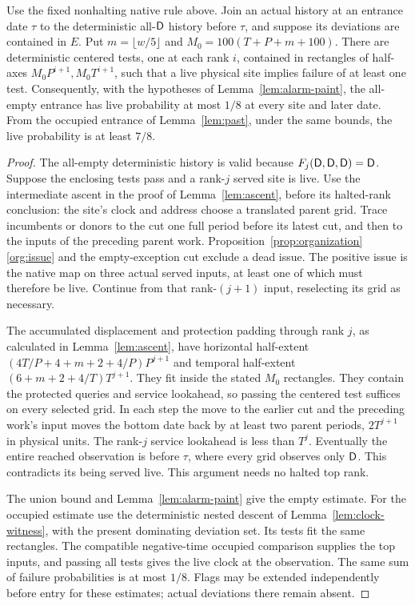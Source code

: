 \begin{lemma}\label{lem:empty-ancestry}
Use the fixed nonhalting native rule above. Join an actual history at an entrance date \(\tau\) to the deterministic all-\(\mathsf D\) history before \(\tau\), and suppose its deviations are contained in \(E\). Put \(m=\lfloor w/5\rfloor\) and \(M_0=100(T+P+m+100)\). There are deterministic centered tests, one at each rank \(i\), contained in rectangles of half-axes \(M_0P^{i+1},M_0T^{i+1}\), such that a live physical site implies failure of at least one test. Consequently, with the hypotheses of Lemma~\ref{lem:alarm-paint}, the all-empty entrance has live probability at most \(1/8\) at every site and later date. From the occupied entrance of Lemma~\ref{lem:past}, under the same bounds, the live probability is at least \(7/8\).
\end{lemma}

\begin{proof}
The all-empty deterministic history is valid because \(F_j(\mathsf D,\mathsf D,\mathsf D)=\mathsf D\). Suppose the enclosing tests pass and a rank-\(j\) served site is live. Use the intermediate ascent in the proof of Lemma~\ref{lem:ascent}, before its halted-rank conclusion: the site's clock and address choose a translated parent grid. Trace incumbents or donors to the cut one full period before its latest cut, and then to the inputs of the preceding parent work. Proposition~\ref{prop:organization}\ref{org:issue} and the empty-exception cut exclude a dead issue. The positive issue is the native map on three actual served inputs, at least one of which must therefore be live. Continue from that rank-\((j+1)\) input, reselecting its grid as necessary.

The accumulated displacement and protection padding through rank \(j\), as calculated in Lemma~\ref{lem:ascent}, have horizontal half-extent
\((4T/P+4+m+2+4/P)P^{j+1}\) and temporal half-extent \((6+m+2+4/T)T^{j+1}\). They fit inside the stated \(M_0\) rectangles. They contain the protected queries and service lookahead, so passing the centered test suffices on every selected grid. In each step the move to the earlier cut and the preceding work's input moves the bottom date back by at least two parent periods, \(2T^{j+1}\) in physical units. The rank-\(j\) service lookahead is less than \(T^j\). Eventually the entire reached observation is before \(\tau\), where every grid observes only \(\mathsf D\). This contradicts its being served live. This argument needs no halted top rank.

The union bound and Lemma~\ref{lem:alarm-paint} give the empty estimate. For the occupied estimate use the deterministic nested descent of Lemma~\ref{lem:clock-witness}, with the present dominating deviation set. Its tests fit the same rectangles. The compatible negative-time occupied comparison supplies the top inputs, and passing all tests gives the live clock at the observation. The same sum of failure probabilities is at most \(1/8\). Flags may be extended independently before entry for these estimates; actual deviations there remain absent.
\end{proof}

